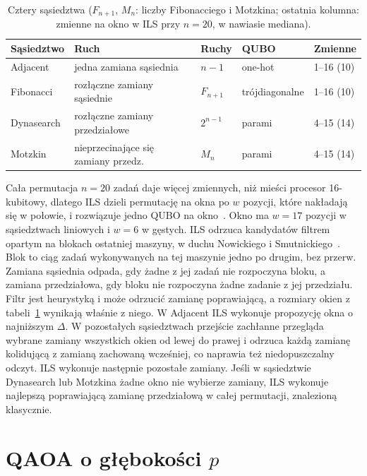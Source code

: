 \documentclass[runningheads]{llncs}
\begin{document}
\begin{table}[t]
\caption{Cztery sąsiedztwa ($F_{n+1}$, $M_n$: liczby Fibonacciego
i Motzkina; ostatnia kolumna: zmienne na okno w ILS przy $n = 20$, w nawiasie
mediana).}
\label{tab:neigh}
\centering
\begin{tabular}{lllll}
\toprule
Sąsiedztwo & Ruch & Ruchy & QUBO & Zmienne \\
\midrule
Adjacent   & jedna zamiana sąsiednia          & $n - 1$   & one-hot       & 1--16 (10) \\
Fibonacci  & rozłączne zamiany sąsiednie      & $F_{n+1}$ & trójdiagonalne & 1--16 (10) \\
Dynasearch & rozłączne zamiany przedziałowe & $2^{n-1}$ & parami        & 4--15 (14) \\
Motzkin    & nieprzecinające się zamiany przedz. & $M_n$     & parami        & 4--15 (14) \\
\bottomrule
\end{tabular}
\end{table}

Cała permutacja $n = 20$ zadań daje więcej zmiennych, niż mieści procesor
16-kubitowy, dlatego ILS dzieli permutację na okna po $w$ pozycji, które nakładają się w połowie,
i rozwiązuje jedno QUBO na
okno~\cite{wojewodzki2026windowed,wojewodzki2026aciids}. Okno ma $w = 17$
pozycji w sąsiedztwach liniowych i $w = 6$ w gęstych. ILS odrzuca kandydatów filtrem opartym na blokach ostatniej maszyny, w duchu
Nowickiego i Smutnickiego~\cite{nowicki1996}. Blok to ciąg zadań
wykonywanych na tej maszynie jedno po drugim, bez przerw. Zamiana sąsiednia odpada, gdy żadne z jej zadań nie
rozpoczyna bloku, a zamiana przedziałowa, gdy bloku nie rozpoczyna żadne
zadanie z jej przedziału. Filtr jest heurystyką i może odrzucić zamianę
poprawiającą, a rozmiary okien z tabeli~\ref{tab:neigh} wynikają właśnie
z niego. W Adjacent ILS wykonuje propozycję okna o najniższym $\Delta$.
W pozostałych sąsiedztwach przejście zachłanne przegląda wybrane zamiany
wszystkich okien od lewej do prawej i odrzuca każdą zamianę kolidującą
z zamianą zachowaną wcześniej, co naprawia też niedopuszczalny odczyt. ILS
wykonuje następnie pozostałe zamiany. Jeśli w sąsiedztwie Dynasearch lub
Motzkina
żadne okno nie wybierze zamiany, ILS wykonuje najlepszą poprawiającą zamianę przedziałową w całej permutacji, znalezioną klasycznie.

\section{QAOA o głębokości $p$}
\end{document}
